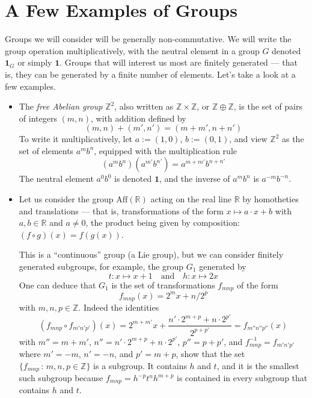 \documentclass{amsart}
\def\1{\bm{1}}
\begin{document}
\section{A Few Examples of Groups}
Groups we will consider will be generally non-commutative. We will write the group operation multiplicatively, with the
neutral element in a group $G$ denoted $\1_{G}$ or simply $\1$. Groups
that will interest us most are finitely generated --- that is,
they can be generated by a finite number of elements. Let’s take a
look at a few examples.
\begin{itemize}
\item The \textit{free Abelian group} $\mathbb{Z}^2$, also written as
  $\mathbb{Z} \times \mathbb{Z}$, or $\mathbb{Z} \oplus \mathbb{Z}$,
  is the set of pairs of integers $(m, n)$, with addition defined by
  \[
    (m, n) + (m', n') = (m + m', n + n')
  \]
  To write it multiplicatively, let $a:=(1,0)$, $b:=(0,1)$, and view
  $\mathbb{Z}^2$ as the set of elements $a^m b^n$, equipped with the
  multiplication rule
  \[
    (a^m b^n)(a^{m'} b^{n'}) = a^{m + m'} b^{n + n'}
  \]
  The neutral element $a^0 b^0$ is denoted $\1$, and the inverse of
  $a^m b^n$ is $a^{-m} b^{-n}$.
\item Let us consider the group $\mathrm{Aff}(\mathbb{R})$ acting on the real
  line $\mathbb{R}$ by homotheties and translations --- that is,
  transformations of the form $x \mapsto a\cdot x + b$ with
  $a, b \in \mathbb{R}$ and $a \neq 0$, the product being given by
  composition: $(f \circ g)(x) = f(g(x))$.

  This is a ``continuous'' group (a Lie group), but we can consider
  finitely generated subgroups, for example, the group $G_1$ generated
  by
  \[
    t : x \mapsto x + 1
    \quad\text{and}\quad
    h : x \mapsto 2x
  \]
  One can deduce that $G_1$ is the set of transformations $f_{mnp}$ of
  the form%
  \[
    f_{mnp}(x) = 2^m x + n/2^p
  \]
  with $m, n, p \in \mathbb{Z}$. Indeed the identities
  \[
    (f_{mnp} \circ f_{m'n'p'})(x)
    =
    2^{m+m'} x + \frac{n'\cdot2^{m+p} + n\cdot 2^{p'}}{2^{p+p'}}= f_{m''n''p''}(x)
  \]
  with $m'' = m + m'$, $n'' = n'\cdot 2^{m+p} + n\cdot 2^{p'}$,
  $p'' = p + p'$, and $f_{mnp}^{-1} = f_{m'n'p'}$ where $m' = -m$,
  $n' = -n$, and $p' = m + p$, show that the set
  $\{f_{mnp}\,:\, m,n,p\in\mathbb{Z}\}$ is a subgroup. It contains $h$ and
  $t$, and it is the smallest such subgroup because
  $f_{mnp} = h^{-p} t^n h^{m+p}$ is contained in every subgroup that
  contains $h$ and $t$.
  

\end{itemize}
\end{document}
